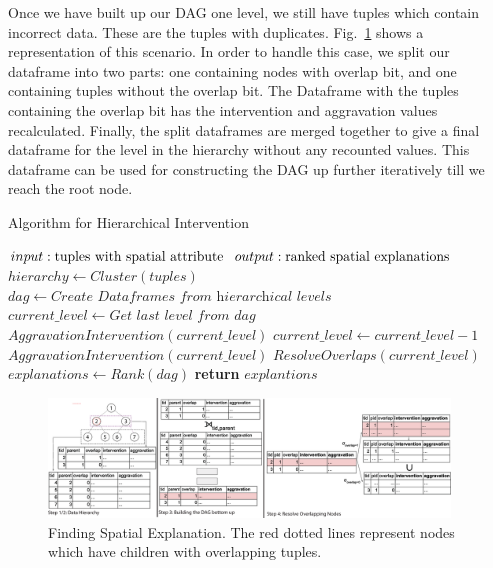 Once we have built up our DAG one level, we still have tuples which contain incorrect data. These are the tuples with duplicates. Fig.~\ref{fig:steps} shows a representation of this scenario. In order to handle this case, we split our dataframe into two parts: one containing nodes with overlap bit, and one containing tuples without the overlap bit. The Dataframe with the tuples containing the overlap bit has the intervention and aggravation values recalculated. Finally, the split dataframes are merged together to give a final dataframe for the level in the hierarchy without any recounted values. This dataframe can be used for constructing the DAG up further iteratively till we reach the root node.

\begin{algorithm}
	\caption{Algorithm for Hierarchical Intervention}\label{alg:hieint}
	\begin{algorithmic}[1]
		\State $input: \textnormal{tuples with spatial attribute}$
		\State $output: \textnormal{ranked spatial explanations}$
		\State $hierarchy \gets Cluster(tuples)$
		\State $dag \gets \textit{Create Dataframes from hierarchical levels}$
		\State $current\_level \gets \textit{Get last level from }dag$
		\State $AggravationIntervention(current\_level)$
		\State $current\_level \gets current\_level - 1$
		\State $AggravationIntervention(current\_level)$
		\State $ResolveOverlaps(current\_level)$
		\EndWhile
		\State $explanations \gets Rank(dag)$
		\State \textbf{return} $explantions$
		\EndProcedure
	\end{algorithmic}
\end{algorithm}




\begin{figure}[t]
	\centerline{\includegraphics[width=0.95\textwidth]{images/steps}}
	\caption{Finding Spatial Explanation. The red dotted lines represent nodes which have children with overlapping tuples.}
	\label{fig:steps}
\end{figure}


